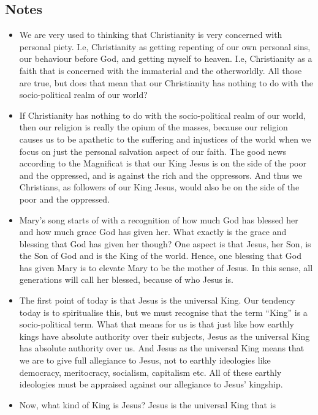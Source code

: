 \subsection*{Notes}
\begin{itemize}
  \item{We are very used to thinking that Christianity is very concerned with
  personal piety.  I.e, Christianity as getting repenting of our own personal
  sins, our behaviour before God, and getting myself to heaven.  I.e,
  Christianity as a faith that is concerned with the immaterial and the
  otherworldly.  All those are true, but does that mean that our Christianity
  has nothing to do with the socio-political realm of our world?}
  \item{If Christianity has nothing to do with the socio-political realm of
  our world, then our religion is really the opium of the masses, because our
  religion causes us to be apathetic to the suffering and injustices of the
  world when we focus on just the personal salvation aspect of our faith.
  The good news according to the Magnificat is that our King Jesus is on the
  side of the poor and the oppressed, and is against the rich and the
  oppressors.  And thus we Christians, as followers of our King Jesus, would
  also be on the side of the poor and the oppressed.}
  \item{Mary's song starts of with a recognition of how much God has blessed
  her and how much grace God has given her.  What exactly is the grace and
  blessing that God has given her though?  One aspect is that Jesus, her Son,
  is the Son of God and is the King of the world.  Hence, one blessing that
  God has given Mary is to elevate Mary to be the mother of Jesus.  In this
  sense, all generations will call her blessed, because of who Jesus is. }
  \item{The first point of today is that Jesus is the universal King.  Our
  tendency today is to spiritualise this, but we must recognise that the term
  ``King'' is a socio-political term.  What that means for us is that just
  like how earthly kings have absolute authority over their subjects, Jesus
  as the universal King has absolute authority over us.  And Jesus as the
  universal King means that we are to give full allegiance to Jesus, not to
  earthly ideologies like democracy, meritocracy, socialism, capitalism etc.
  All of these earthly ideologies must be appraised against our allegiance to
  Jesus' kingship. }
  \item{Now, what kind of King is Jesus?  Jesus is the universal King that is
}
\end{itemize}
